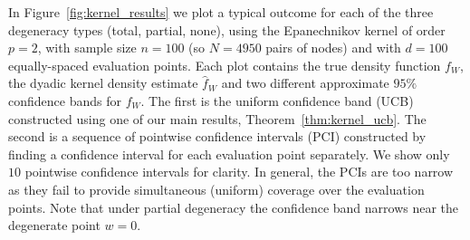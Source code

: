 In Figure~\ref{fig:kernel_results} we plot a typical outcome for each of the
three
degeneracy types (total, partial, none), using the Epanechnikov kernel of order
$p=2$, with sample size $n=100$ (so $N=4950$ pairs of nodes) and with $d=100$
equally-spaced evaluation points. Each plot contains the true density function
$f_W$, the dyadic kernel density estimate $\hat f_W$ and two different
approximate $95\%$ confidence bands for $f_W$. The first is the uniform
confidence band (UCB) constructed using one of our main results,
Theorem~\ref{thm:kernel_ucb}. The second is a sequence of pointwise confidence
intervals (PCI) constructed by finding a confidence interval for each
evaluation point separately. We show only $10$ pointwise confidence intervals
for clarity. In general, the PCIs are too narrow as they fail to provide
simultaneous (uniform) coverage over the evaluation points. Note that under
partial degeneracy the confidence band narrows near the degenerate point
$w = 0$.

